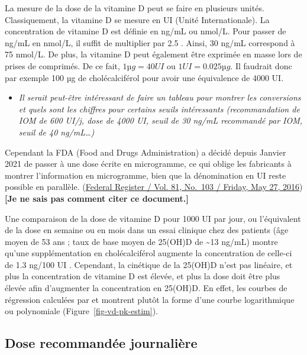 \documentclass[
  a4paper,
  DIV=11,
  numbers=noendperiod,
  listof=totoc]{scrreprt}
\providecommand{\tightlist}{%
  \setlength{\itemsep}{0pt}\setlength{\parskip}{0pt}}\usepackage{longtable,booktabs,array}
\begin{document}
La mesure de la dose de la vitamine D peut se faire en plusieurs unités.
Classiquement, la vitamine D se mesure en UI (Unité Internationale). La
concentration de vitamine D est définie en ng/mL ou nmol/L. Pour passer
de ng/mL en nmol/L, il suffit de multiplier par 2.5
\autocite{Pramyothin.2012}. Ainsi, 30 ng/mL correspond à 75 nmol/L. De
plus, la vitamine D peut également être exprimée en masse lors de prises
de comprimés. De ce fait, \(1 µg = 40 UI\) ou \(1 UI = 0.025 µg\). Il
faudrait donc par exemple 100 µg de cholécalciférol pour avoir une
équivalence de 4000 UI.

\begin{itemize}
\tightlist
\item
  \emph{Il serait peut-être intéressant de faire un tableau pour montrer
  les conversions et quels sont les chiffres pour certains seuils
  intéressants (recommandation de IOM de 600 UI/j, dose de 4000 UI,
  seuil de 30 ng/mL recommandé par IOM, seuil de 40 ng/mL\ldots)}
\end{itemize}

Cependant la FDA (Food and Drugs Administration) a décidé depuis Janvier
2021 de passer à une dose écrite en microgramme, ce qui oblige les
fabricants à montrer l'information en microgramme, bien que la
dénomination en UI reste possible en parallèle.
(\href{https://www.govinfo.gov/content/pkg/FR-2016-05-27/pdf/2016-11867.pdf}{Federal
Register / Vol. 81, No.~103 / Friday, May 27, 2016}) \textbf{{[}Je ne
sais pas comment citer ce document.{]}}

Une comparaison de la dose de vitamine D pour 1000 UI par jour, ou
l'équivalent de la dose en semaine ou en mois dans un essai clinique
chez des patients (âge moyen de 53 ans ; taux de base moyen de 25(OH)D
de \textasciitilde13 ng/mL) montre qu'une supplémentation en
cholécalciférol augmente la concentration de celle-ci de 1.3 ng/100 UI
\autocite{Bouillon.2017}. Cependant, la cinétique de la 25(OH)D n'est
pas linéaire, et plus la concentration de vitamine D est élevée, et plus
la dose doit être plus élevée afin d'augmenter la concentration en
25(OH)D. En effet, les courbes de régression calculées par
\textcite{Veugelers.2014} et \textcite{Heaney.2015} montrent plutôt la
forme d'une courbe logarithmique ou polynomiale
(Figure~\ref{fig-vd-pk-estim}).

\hypertarget{dose-recommanduxe9e-journaliuxe8re}{%
\subsection{Dose recommandée
journalière}\label{dose-recommanduxe9e-journaliuxe8re}}
\end{document}

